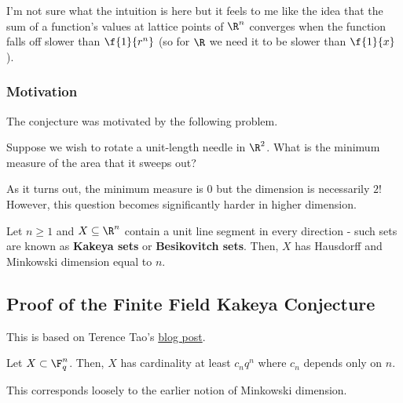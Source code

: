 I'm not sure what the intuition is here but it feels to me like the idea that the sum of a function's values at lattice points of $\R^n$ converges when the function falls off slower than $\f{1}{r^n}$ (so for $\R$ we need it to be slower than $\f{1}{x}$). 

\subsubsection{Motivation}

The conjecture was motivated by the following problem.

\begin{problem}
    Suppose we wish to rotate a unit-length needle in $\R^2$. What is the minimum measure of the area that it sweeps out?
\end{problem}

As it turns out, the minimum measure is $0$ but the dimension is necessarily $2$! However, this question becomes significantly harder in higher dimension. 

\begin{conjecture}
    Let $n \geq 1$ and $X \subseteq \R^n$ contain a unit line segment in every direction - such sets are known as \textbf{Kakeya sets} or \textbf{Besikovitch sets}. Then, $X$ has Hausdorff and Minkowski dimension equal to $n$. 
\end{conjecture}

\subsection{Proof of the Finite Field Kakeya Conjecture}

This is based on  Terence Tao's \href{https://terrytao.wordpress.com/2008/03/24/dvirs-proof-of-the-finite-field-kakeya-conjecture/}{blog post}. 
\begin{theorem}
    Let $X \subset \F_q^n$. Then, $X$ has cardinality at least $c_nq^n$ where $c_n$ depends only on $n$.  
\end{theorem}

This corresponds loosely to the earlier notion of Minkowski dimension. 

